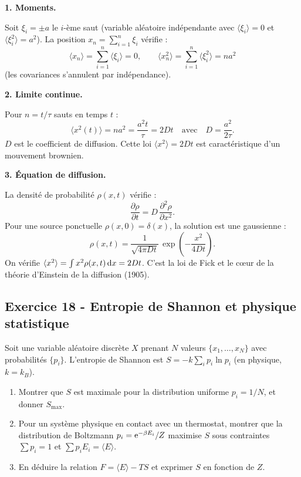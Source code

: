 \documentclass[12pt,a4paper]{article}
\begin{document}
\begin{boitecorrige}

\textbf{1. Moments.}

Soit $\xi_i = \pm a$ le $i$-ème saut (variable aléatoire indépendante avec $\langle\xi_i\rangle = 0$ et $\langle\xi_i^2\rangle = a^2$). La position $x_n = \sum_{i=1}^n \xi_i$ vérifie :
\[
\langle x_n\rangle = \sum_{i=1}^n \langle\xi_i\rangle = 0, \qquad \langle x_n^2\rangle = \sum_{i=1}^n \langle\xi_i^2\rangle = na^2
\]
(les covariances s'annulent par indépendance).

\textbf{2. Limite continue.}

Pour $n = t/\tau$ sauts en temps $t$ :
\[
\langle x^2(t)\rangle = na^2 = \frac{a^2 t}{\tau} = 2Dt \quad\text{avec}\quad D = \frac{a^2}{2\tau}.
\]
$D$ est le coefficient de diffusion. Cette loi $\langle x^2\rangle = 2Dt$ est caractéristique d'un mouvement brownien.

\textbf{3. Équation de diffusion.}

La densité de probabilité $\rho(x,t)$ vérifie :
\[
\frac{\partial\rho}{\partial t} = D\,\frac{\partial^2\rho}{\partial x^2}.
\]
Pour une source ponctuelle $\rho(x,0) = \delta(x)$, la solution est une gaussienne :
\[
\rho(x,t) = \frac{1}{\sqrt{4\pi Dt}}\,\exp\!\left(-\frac{x^2}{4Dt}\right).
\]
On vérifie $\langle x^2\rangle = \int x^2 \rho(x,t)\,\mathrm{d} x = 2Dt$. C'est la loi de Fick et le c\oe{}ur de la théorie d'Einstein de la diffusion (1905).

\end{boitecorrige}

\subsection*{Exercice 18 - Entropie de Shannon et physique statistique \niveau{\difficile}}

\begin{boiteexercice}
Soit une variable aléatoire discrète $X$ prenant $N$ valeurs $\{x_1,\ldots,x_N\}$ avec probabilités $\{p_i\}$. L'entropie de Shannon est $S = -k\sum_i p_i\ln p_i$ (en physique, $k=k_B$).
\begin{enumerate}
  \item Montrer que $S$ est maximale pour la distribution uniforme $p_i = 1/N$, et donner $S_\text{max}$.
  \item Pour un système physique en contact avec un thermostat, montrer que la distribution de Boltzmann $p_i = \mathrm{e}^{-\beta E_i}/Z$ maximise $S$ sous contraintes $\sum p_i = 1$ et $\sum p_i E_i = \langle E\rangle$.
  \item En déduire la relation $F = \langle E\rangle - TS$ et exprimer $S$ en fonction de $Z$.
\end{enumerate}
\end{boiteexercice}
\end{document}
